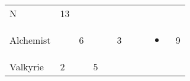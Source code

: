 \documentclass[12pt]{article}
\begin{document}
\begin{longtable}[]{@{}llllllllll@{}}
\begin{minipage}[t]{0.07\columnwidth}
N
\strut\end{minipage} &
\begin{minipage}[t]{0.08\columnwidth}\raggedright\strut
13
\strut\end{minipage}\tabularnewline
\begin{minipage}[t]{0.13\columnwidth}\raggedright\strut
Alchemist
\strut\end{minipage} &
\begin{minipage}[t]{0.06\columnwidth}\raggedright\strut
\strut\end{minipage} &
\begin{minipage}[t]{0.06\columnwidth}\raggedright\strut
6
\strut\end{minipage} &
\begin{minipage}[t]{0.06\columnwidth}\raggedright\strut
\strut\end{minipage} &
\begin{minipage}[t]{0.06\columnwidth}\raggedright\strut
\strut\end{minipage} &
\begin{minipage}[t]{0.06\columnwidth}\raggedright\strut
3
\strut\end{minipage} &
\begin{minipage}[t]{0.06\columnwidth}\raggedright\strut
\strut\end{minipage} &
\begin{minipage}[t]{0.06\columnwidth}\raggedright\strut
\strut\end{minipage} &
\begin{minipage}[t]{0.07\columnwidth}\raggedright\strut
\begin{itemize}
\item
\end{itemize}
\strut\end{minipage} &
\begin{minipage}[t]{0.08\columnwidth}\raggedright\strut
9
\strut\end{minipage}\tabularnewline
\begin{minipage}[t]{0.13\columnwidth}\raggedright\strut
Valkyrie
\strut\end{minipage} &
\begin{minipage}[t]{0.06\columnwidth}\raggedright\strut
2
\strut\end{minipage} &
\begin{minipage}[t]{0.06\columnwidth}\raggedright\strut
\strut\end{minipage} &
\begin{minipage}[t]{0.06\columnwidth}\raggedright\strut
5

\end{minipage}
\end{longtable}
\end{document}
